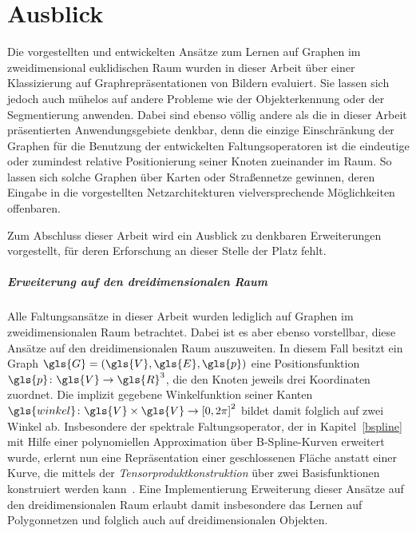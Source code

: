 \chapter{Ausblick}
\label{ausblick}

Die vorgestellten und entwickelten Ansätze zum Lernen auf Graphen im zweidimensional euklidischen Raum wurden in dieser Arbeit über einer Klassizierung auf Graphrepräsentationen von Bildern evaluiert.
Sie lassen sich jedoch auch mühelos auf andere Probleme wie \zB{} der Objekterkennung oder der Segmentierung anwenden.
Dabei sind ebenso völlig andere als die in dieser Arbeit präsentierten Anwendungsgebiete denkbar, denn die einzige Einschränkung der Graphen für die Benutzung der entwickelten Faltungsoperatoren ist die eindeutige oder zumindest relative Positionierung seiner Knoten zueinander im Raum.
So lassen sich solche Graphen \bspw{} über Karten oder Straßennetze gewinnen, deren Eingabe in die vorgestellten Netzarchitekturen vielversprechende Möglichkeiten offenbaren.

Zum Abschluss dieser Arbeit wird ein Ausblick zu denkbaren Erweiterungen vorgestellt, für deren Erforschung an dieser Stelle der Platz fehlt.

\paragraph{Erweiterung auf den dreidimensionalen Raum}
\label{dredimensionale_erweiterung}

Alle Faltungsansätze in dieser Arbeit wurden lediglich auf Graphen im zweidimensionalen Raum betrachtet.
Dabei ist es aber ebenso vorstellbar, diese Ansätze auf den dreidimensionalen Raum auszuweiten.
In diesem Fall besitzt ein Graph $\gls{G} = \left(\gls{V}, \gls{E}, \gls{p}\right)$ eine Positionsfunktion $\gls{p} \colon \gls{V} \to \gls{R}^3$, die den Knoten jeweils drei Koordinaten zuordnet.
Die implizit gegebene Winkelfunktion seiner Kanten $\gls{winkel} \colon \gls{V} \times \gls{V} \to {\left[0, 2\pi\right]}^2$ bildet damit folglich auf zwei Winkel ab.
Insbesondere der spektrale Faltungsoperator, der in Kapitel~\ref{bspline} mit Hilfe einer polynomiellen Approximation über B-Spline-Kurven erweitert wurde, erlernt nun eine Repräsentation einer geschlossenen Fläche anstatt einer Kurve, die mittels der \emph{Tensorproduktkonstruktion} über zwei Basisfunktionen konstruiert werden kann~\cite{gm}.
Eine Implementierung \bzw{} Erweiterung dieser Ansätze auf den dreidimensionalen Raum erlaubt damit insbesondere das Lernen auf Polygonnetzen und folglich auch auf dreidimensionalen Objekten.

